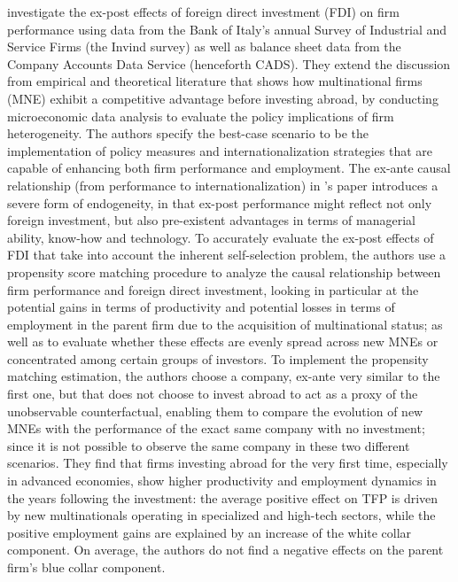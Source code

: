\cite{borin2016foreign} investigate the ex-post effects of foreign direct investment (FDI) on firm performance using data from the Bank of Italy’s annual Survey of Industrial and Service Firms (the Invind survey) as well as balance sheet data from the Company Accounts Data Service (henceforth CADS).  They extend the discussion from empirical and theoretical literature that shows how multinational firms (MNE) exhibit a competitive advantage before investing abroad, by conducting microeconomic data analysis to evaluate the policy implications of firm heterogeneity. The authors specify the best-case scenario to be the implementation of policy measures and internationalization strategies that are capable of enhancing both firm performance and employment. The ex-ante causal relationship (from performance to internationalization) in \cite{borin2016foreign}’s paper introduces a severe form of endogeneity, in that ex-post performance might reflect not only foreign investment, but also pre-existent advantages in terms of managerial ability, know-how and technology. To accurately evaluate the ex-post effects of FDI that take into account the inherent self-selection problem, the authors use a propensity score matching procedure to analyze the causal relationship between firm performance and foreign direct investment, looking in particular at the potential gains in terms of productivity and potential losses in terms of employment in the parent firm due to the acquisition of multinational status; as well as to evaluate whether these effects are evenly spread across new MNEs or concentrated among certain groups of investors. To implement the propensity matching estimation, the authors choose a company, ex-ante very similar to the first one, but that does not choose to invest abroad to act as a proxy of the unobservable counterfactual, enabling them to compare the evolution of new MNEs with the performance of the exact same company with no investment; since it is not possible to observe the same company in these two different scenarios. They find that firms investing abroad for the very first time, especially in advanced economies, show higher productivity and employment dynamics in the years following the investment: the average positive effect on TFP is driven by new multinationals operating in specialized and high-tech sectors, while the positive employment gains are explained by an increase of the white collar component. On average, the authors do not find a negative effects on the parent firm's blue collar component. \\ \par

